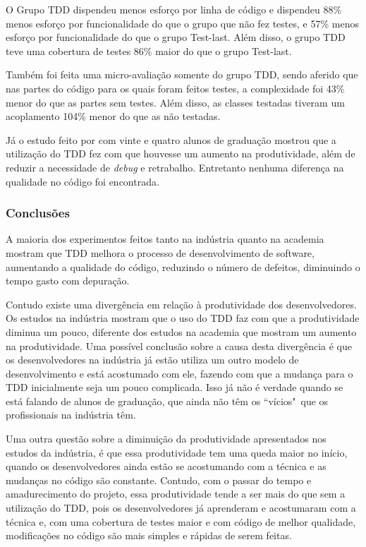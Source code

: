 O Grupo TDD dispendeu menos esforço por linha de código e dispendeu 88\% menos esforço por funcionalidade do que o grupo que não fez testes, e 57\% menos esforço por funcionalidade do que o grupo Test-last. Além disso, o grupo TDD teve uma cobertura de testes 86\% maior do que o grupo Test-last.

Também foi feita uma micro-avaliação somente do grupo TDD, sendo aferido que nas partes do código para os quais foram feitos testes, a complexidade foi 43\% menor do que as partes sem testes. Além disso, as classes testadas tiveram um acoplamento 104\% menor do que as não testadas.

Já o estudo feito por  com vinte e quatro alunos de graduação mostrou que a utilização do TDD fez com que houvesse um aumento na produtividade, além de reduzir a necessidade de \textit{debug} e retrabalho. Entretanto nenhuma diferença na qualidade no código foi encontrada.


\subsubsection{Conclusões} %
\label{sub:conclusoes}

A maioria dos experimentos feitos tanto na indústria quanto na academia mostram que TDD melhora o processo de desenvolvimento de software, aumentando a qualidade do código, reduzindo o número de defeitos, diminuindo o tempo gasto com depuração.

Contudo existe uma divergência em relação à produtividade dos desenvolvedores. Os estudos na indústria mostram que o uso do TDD faz com que a produtividade diminua um pouco, diferente dos estudos na academia que mostram um aumento na produtividade. Uma possível conclusão sobre a causa desta divergência é que os desenvolvedores na indústria já estão utiliza um outro modelo de desenvolvimento e está acostumado com ele, fazendo com que a mudança para o TDD inicialmente seja um pouco complicada. Isso já não é verdade quando se está falando de alunos de graduação, que ainda não têm os ``vícios"\ que os profissionais na indústria têm.

Uma outra questão sobre a diminuição da produtividade apresentados nos estudos da indústria, é que essa produtividade tem uma queda maior no início, quando os desenvolvedores ainda estão se acostumando com a técnica e as mudanças no código são constante. Contudo, com o passar do tempo e amadurecimento do projeto, essa produtividade tende a ser mais do que sem a utilização do TDD, pois os desenvolvedores já aprenderam e acostumaram com a técnica e, com uma cobertura de testes maior e com código de melhor qualidade, modificações no código são mais simples e rápidas de serem feitas.


